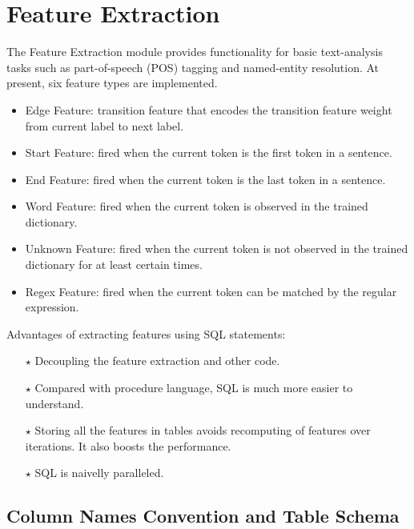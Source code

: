 \section{Feature Extraction}
The Feature Extraction module provides functionality for basic text-analysis
tasks such as part-of-speech (POS) tagging and named-entity resolution.
At present, six feature types are implemented.
    \begin{itemize}
    \item Edge Feature: transition feature that encodes the transition feature weight from current label to next label.
    \item Start Feature: fired when the current token is the first token in a sentence.
    \item End Feature: fired when the current token is the last token in a sentence.
    \item Word Feature: fired when the current token is observed in the trained dictionary.
    \item Unknown Feature: fired when the current token is not observed in the trained dictionary for at least certain times.
    \item Regex Feature: fired when the current token can be matched by the regular expression.
    \end{itemize}

Advantages of extracting features using SQL statements:
\begin{itemize}
\item [$\star$] Decoupling the feature extraction and other code.
\item [$\star$] Compared with procedure language, SQL is much more easier to understand.
\item [$\star$] Storing all the features in tables avoids recomputing of features over iterations. It also boosts the performance.
\item [$\star$] SQL is naivelly paralleled.
\end{itemize}

\subsection{Column Names Convention and Table Schema}
